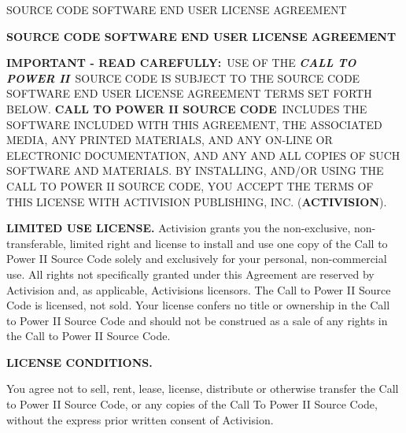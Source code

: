 \begin{section}{SOURCE CODE SOFTWARE END USER LICENSE AGREEMENT}

\begin{center}
\textbf{{\small SOURCE CODE SOFTWARE END USER LICENSE AGREEMENT}}
\end{center}

\begin{flushleft}
\textbf{{\footnotesize IMPORTANT - READ CAREFULLY:}}{\footnotesize\ USE OF THE
}\textbf{\textit{{\footnotesize CALL TO POWER II}}}{\footnotesize\ SOURCE CODE
IS SUBJECT TO THE SOURCE CODE SOFTWARE END USER LICENSE AGREEMENT TERMS SET
FORTH BELOW. }\textbf{{\footnotesize CALL TO POWER II SOURCE
CODE}}{\footnotesize\ INCLUDES THE SOFTWARE INCLUDED WITH THIS AGREEMENT, THE ASSOCIATED MEDIA, ANY PRINTED MATERIALS, AND ANY ON-LINE OR ELECTRONIC DOCUMENTATION, AND ANY AND ALL COPIES OF SUCH SOFTWARE AND MATERIALS.  BY INSTALLING, AND/OR USING THE CALL TO POWER II SOURCE CODE, YOU ACCEPT THE TERMS OF THIS LICENSE WITH ACTIVISION PUBLISHING, INC. (}\textbf{{\footnotesize ACTIVISION}}{\footnotesize ). }
\end{flushleft}


\begin{flushleft}
\textbf{{\footnotesize LIMITED USE LICENSE.  }}{\footnotesize Activision grants you the non-exclusive, non-transferable, limited right and license to install and use one copy of the Call to Power II Source Code solely and exclusively for your personal, non-commercial use.  All rights not specifically granted under this Agreement are reserved by Activision and, as applicable, Activisions licensors.  The Call to Power II Source Code is licensed, not sold.  Your license confers no title or ownership in the Call to Power II Source Code and should not be construed as a sale of any rights in the Call to Power II Source Code.}
\end{flushleft}


\begin{flushleft}
\textbf{{\footnotesize LICENSE CONDITIONS.}}
\end{flushleft}


\begin{flushleft}
\textbf{{\footnotesize 	}}{\footnotesize You agree not to sell, rent, lease, license, distribute or otherwise transfer the Call to Power II Source Code, or any copies of the Call To Power II Source Code, without the express prior written consent of Activision.}
\end{flushleft}



\end{section}
